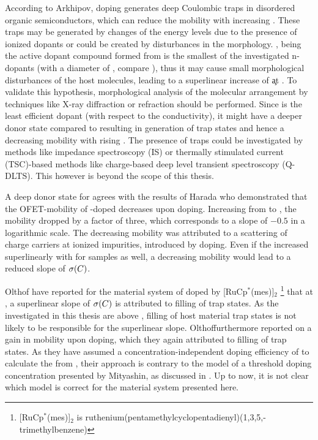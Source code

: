 According to Arkhipov\etal\cite{Arkhipov2005}, doping generates deep Coulombic traps in disordered organic semiconductors, which can reduce the mobility with increasing \CLong. These traps may be generated by changes of the energy levels due to the presence of ionized dopants or could be created by disturbances in the morphology. \OHdmbi, being the active dopant compound formed from \dmbi is the smallest of the investigated n-dopants (with a diameter of , compare ), thus it may cause small morphological disturbances of the \CS host molecules, leading to a superlinear increase of \c at . To validate this hypothesis, morphological analysis of the molecular arrangement by techniques like X-ray diffraction or refraction should be performed.
%
Since \aob is the least efficient dopant (with respect to the conductivity), it might have a deeper donor state compared to \dmbi resulting in generation of trap states and hence a decreasing mobility with rising \CLong. The presence of traps could be investigated \eg by methods like impedance spectroscopy (IS)\cite{Burtone2012} or thermally stimulated current (TSC)-based methods like charge-based deep level transient spectroscopy (Q-DLTS)\cite{Gaudin2001}. This however is beyond the scope of this thesis.

A deep donor state for \aob agrees with the results of Harada\etal\cite{Harada2007} who demonstrated that the OFET-mobility of \aob-doped \CS decreases upon doping. Increasing \C from  to , the mobility dropped by a factor of three, which corresponds to a slope of $-0.5$ in a logarithmic scale. The decreasing mobility was attributed to a scattering of charge carriers at ionized impurities, introduced by doping.
Even if the \neLongL increased superlinearly with \C for \aob samples as well, a decreasing mobility would lead to a reduced slope of $\c(\C)$.

Olthof\etal\cite{Olthof2012} have reported for the material system of \CS doped by [RuCp$^*$(mes)]$_2$%
\footnote{[RuCp$^*$(mes)]$_2$ is ruthenium(pentamethylcyclopentadienyl)(1,3,5,-trimethylbenzene)}
that at , a superlinear slope of $\c(\C)$ is attributed to filling of trap states. As the \CLongs investigated in this thesis are above , filling of host material trap states is not likely to be responsible for the superlinear slope.
Olthof\etal furthermore reported on a gain in mobility upon doping, which they again attributed to filling of trap states. As they have assumed a concentration-independent doping efficiency of \DopEff[100] to calculate the \neLongL from \C, their approach is contrary to the model of a threshold doping concentration presented by Mityashin\etal\cite{Mityashin2012a}, as discussed in . Up to now, it is not clear which model is correct for the material system presented here.

